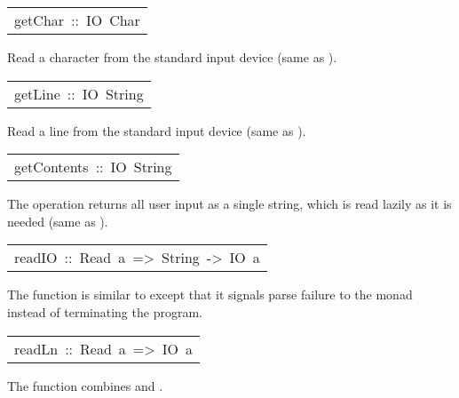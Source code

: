 \begin{haddockdesc}
\item[\begin{tabular}{@{}l}
getChar\ ::\ IO\ Char
\end{tabular}]\haddockbegindoc
Read a character from the standard input device
 (same as  ).
\par

\end{haddockdesc}
\begin{haddockdesc}
\item[\begin{tabular}{@{}l}
getLine\ ::\ IO\ String
\end{tabular}]\haddockbegindoc
Read a line from the standard input device
 (same as  ).
\par

\end{haddockdesc}
\begin{haddockdesc}
\item[\begin{tabular}{@{}l}
getContents\ ::\ IO\ String
\end{tabular}]\haddockbegindoc
The  operation returns all user input as a single string,
 which is read lazily as it is needed
 (same as  ).
\par

\end{haddockdesc}
\begin{haddockdesc}
\item[\begin{tabular}{@{}l}
readIO\ ::\ Read\ a\ =>\ String\ ->\ IO\ a
\end{tabular}]\haddockbegindoc
The  function is similar to  except that it signals
 parse failure to the  monad instead of terminating the program.
\par

\end{haddockdesc}
\begin{haddockdesc}
\item[\begin{tabular}{@{}l}
readLn\ ::\ Read\ a\ =>\ IO\ a
\end{tabular}]\haddockbegindoc
The  function combines  and .
\par

\end{haddockdesc}
